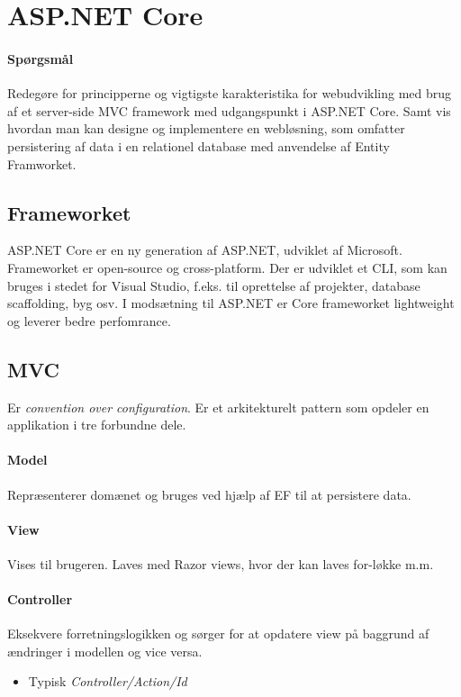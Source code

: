 \section{ASP.NET Core}

\paragraph{Spørgsmål}
Redegøre for principperne og vigtigste karakteristika for webudvikling med brug af et server-side MVC framework med udgangspunkt i ASP.NET Core. Samt vis hvordan man kan designe og implementere en	webløsning, som omfatter persistering af data i en relationel database med anvendelse af Entity Framworket.

\subsection{Frameworket}
ASP.NET Core er en ny generation af ASP.NET, udviklet af Microsoft. Frameworket er open-source og cross-platform.
Der er udviklet et CLI, som kan bruges i stedet for Visual Studio, f.eks. til oprettelse af projekter, database scaffolding, byg osv.
I modsætning til ASP.NET er Core frameworket lightweight og leverer bedre perfomrance.

\subsection{MVC}
Er \textit{convention over configuration}. Er et arkitekturelt pattern som opdeler en applikation i tre forbundne dele.

\paragraph{Model} Repræsenterer domænet og bruges ved hjælp af EF til at persistere data.

\paragraph{View} Vises til brugeren. Laves med Razor views, hvor der kan laves for-løkke m.m.

\paragraph{Controller} Eksekvere forretningslogikken og sørger for at opdatere view på baggrund af ændringer i modellen og vice versa.

\begin{itemize}
	\item Typisk \textit{Controller/Action/Id}
\end{itemize}

